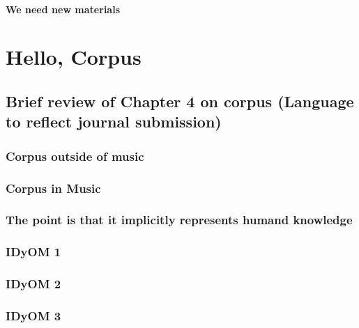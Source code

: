 \documentclass[]{book}
\theoremstyle{definition}
\theoremstyle{definition}
\theoremstyle{definition}
\theoremstyle{remark}
\begin{document}
\hypertarget{we-need-new-materials}{%
\subsubsection{We need new materials}\label{we-need-new-materials}}

\hypertarget{hello-corpus}{%
\chapter{Hello, Corpus}\label{hello-corpus}}

\hypertarget{brief-review-of-chapter-4-on-corpus-language-to-reflect-journal-submission}{%
\section{Brief review of Chapter 4 on corpus (Language to reflect
journal
submission)}\label{brief-review-of-chapter-4-on-corpus-language-to-reflect-journal-submission}}

\hypertarget{corpus-outside-of-music}{%
\subsection{Corpus outside of music}\label{corpus-outside-of-music}}

\hypertarget{corpus-in-music}{%
\subsection{Corpus in Music}\label{corpus-in-music}}

\hypertarget{the-point-is-that-it-implicitly-represents-humand-knowledge}{%
\subsection{The point is that it implicitly represents humand
knowledge}\label{the-point-is-that-it-implicitly-represents-humand-knowledge}}

\hypertarget{idyom-1}{%
\subsection{IDyOM 1}\label{idyom-1}}

\hypertarget{idyom-2}{%
\subsection{IDyOM 2}\label{idyom-2}}

\hypertarget{idyom-3}{%
\subsection{IDyOM 3}\label{idyom-3}}
\end{document}
